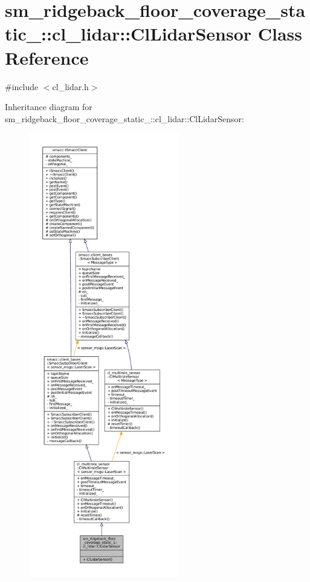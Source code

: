\hypertarget{classsm__ridgeback__floor__coverage__static__1_1_1cl__lidar_1_1ClLidarSensor}{}\section{sm\+\_\+ridgeback\+\_\+floor\+\_\+coverage\+\_\+static\+\_\+:\+:cl\+\_\+lidar\+:\+:Cl\+Lidar\+Sensor Class Reference}
\label{classsm__ridgeback__floor__coverage__static__1_1_1cl__lidar_1_1ClLidarSensor}


{\ttfamily \#include $<$cl\+\_\+lidar.\+h$>$}



Inheritance diagram for sm\+\_\+ridgeback\+\_\+floor\+\_\+coverage\+\_\+static\+\_\+:\+:cl\+\_\+lidar\+:\+:Cl\+Lidar\+Sensor\+:
\nopagebreak
\begin{figure}[H]
\begin{center}
\leavevmode
\includegraphics[height=550pt]{classsm__ridgeback__floor__coverage__static__1_1_1cl__lidar_1_1ClLidarSensor__inherit__graph}
\end{center}
\end{figure}


